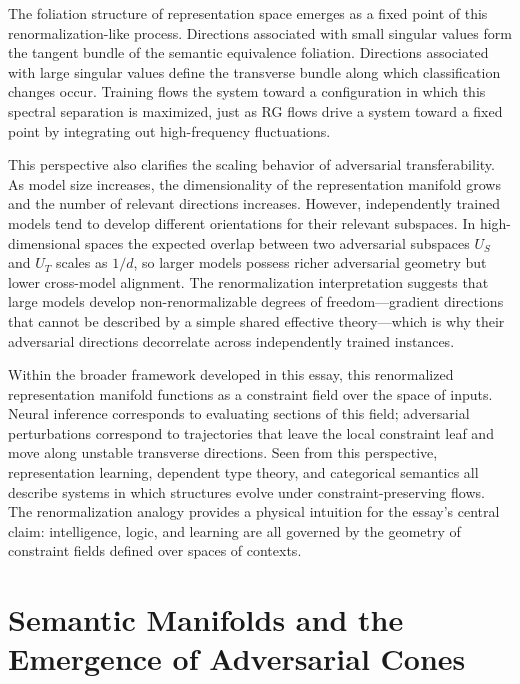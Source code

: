 \documentclass[12pt,a4paper]{article}
\theoremstyle{plain}
\theoremstyle{definition}
\begin{document}
The foliation structure of representation space emerges as a fixed point of this
renormalization-like process. Directions associated with small singular values
form the tangent bundle of the semantic equivalence foliation. Directions
associated with large singular values define the transverse bundle along which
classification changes occur. Training flows the system toward a configuration
in which this spectral separation is maximized, just as RG flows drive a system
toward a fixed point by integrating out high-frequency fluctuations.

This perspective also clarifies the scaling behavior of adversarial
transferability. As model size increases, the dimensionality of the
representation manifold grows and the number of relevant directions increases.
However, independently trained models tend to develop different orientations for
their relevant subspaces. In high-dimensional spaces the expected overlap
between two adversarial subspaces $U_S$ and $U_T$ scales as $1/d$, so larger
models possess richer adversarial geometry but lower cross-model alignment. The
renormalization interpretation suggests that large models develop
non-renormalizable degrees of freedom---gradient directions that cannot be
described by a simple shared effective theory---which is why their adversarial
directions decorrelate across independently trained instances.

Within the broader framework developed in this essay, this renormalized
representation manifold functions as a constraint field over the space of inputs.
Neural inference corresponds to evaluating sections of this field; adversarial
perturbations correspond to trajectories that leave the local constraint leaf
and move along unstable transverse directions. Seen from this perspective,
representation learning, dependent type theory, and categorical semantics all
describe systems in which structures evolve under constraint-preserving flows.
The renormalization analogy provides a physical intuition for the essay's central
claim: intelligence, logic, and learning are all governed by the geometry of
constraint fields defined over spaces of contexts.

\section{Semantic Manifolds and the Emergence of Adversarial Cones}
\label{sec:cones}
\end{document}
